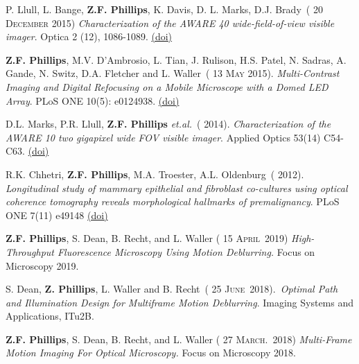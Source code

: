 \documentclass[12pt,letterpaper]{article}
\newcommand{\mhead}[1]{\leavevmode\marginpar{\sffamily\footnotesize #1}}
\renewcommand{\date}[1]{{} #1}
\begin{document}
\medskip
P. Llull, L. Bange, \textbf{Z.F. Phillips}, K. Davis, D. L. Marks, D.J. Brady~(\date{20 \textsc{December} 2015}) \emph{Characterization of the AWARE 40 wide-field-of-view visible imager}. Optica 2 (12), 1086-1089. \href{https://doi.org/10.1364/OPTICA.2.001086}{(doi)}

\medskip
\textbf{Z.F. Phillips}, M.V. D'Ambrosio, L. Tian, J. Rulison, H.S. Patel, N. Sadras, A. Gande, N. Switz, \linebreak D.A. Fletcher and L. Waller~(\date{13 \textsc{May} 2015}).
\emph{Multi-Contrast Imaging and Digital Refocusing on a Mobile  \linebreak Microscope with a Domed LED Array}.
PLoS ONE 10(5): e0124938. \href{http://journals.plos.org/plosone/article?id=10.1371/journal.pone.0124938}{(doi)}

\medskip
\par D.L. Marks, P.R. Llull, \textbf{Z.F. Phillips} \textit{et.al.}~(\date{2014}).
\emph{Characterization of the AWARE 10 two gigapixel wide FOV visible imager}.
Applied Optics 53(14) C54-C63.  \href{https://www.osapublishing.org/ao/abstract.cfm?uri=ao-53-13-C54}{(doi)}

\medskip
R.K. Chhetri, \textbf{Z.F. Phillips}, M.A. Troester, A.L. Oldenburg~(\date{2012}).
\emph{Longitudinal study of mammary \linebreak epithelial and fibroblast co-cultures using optical coherence tomography reveals morphological  \linebreak hallmarks of premalignancy}.
PLoS ONE 7(11) e49148  \href{http://journals.plos.org/plosone/article?id=10.1371/journal.pone.0049148}{(doi)}

\medskip

\medskip
\mhead{Conference Proceedings}%

\par\vspace{-\baselineskip}

\textbf{Z.F. Phillips}, S. Dean, B. Recht, and L. Waller (\date{15 \textsc{April}~2019})
\emph{High-Throughput Fluorescence  \linebreak Microscopy Using Motion Deblurring.} Focus on Microscopy 2019.
\medskip

S. Dean, \textbf{Z. Phillips}, L. Waller and B. Recht~(\date{25 \textsc{June}~2018}).~\emph{Optimal Path and Illumination Design for Multiframe Motion Deblurring}.
Imaging Systems and Applications, ITu2B.
\medskip

\textbf{Z.F. Phillips}, S. Dean, B. Recht, and L. Waller (\date{27 \textsc{March.}~2018})
\emph{Multi-Frame Motion Imaging For  \linebreak Optical Microscopy.} Focus on Microscopy 2018.
\medskip
\end{document}
